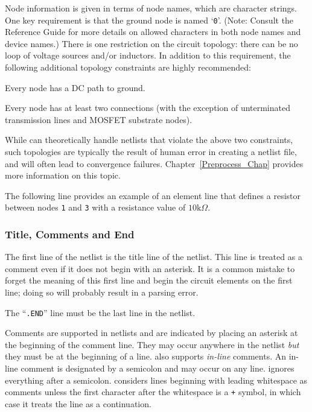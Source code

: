 Node information is given in terms of   node names, which are character strings.  One key
requirement is that the  ground node is named `\texttt{0}'.
(Note: Consult the \Xyce{} Reference Guide\ReferenceGuide{} for more details on 
allowed characters in both node names and device names.)
There is one restriction on the  
circuit topology: there can be no loop of voltage sources and/or inductors.
In addition to this requirement, the following additional topology 
constraints are highly recommended:
\begin{XyceItemize}
\item Every node has a DC path to ground.
\item Every node has at least two connections (with the exception of
  unterminated transmission lines and MOSFET substrate nodes).
\end{XyceItemize}
While \Xyce{} can theoretically handle netlists that violate the above two 
constraints, such topologies are typically the result of human error in 
creating a netlist file, and will often lead to convergence failures.  Chapter~\ref{Preprocess_Chap} provides more information on this topic.


The following line provides an example of an element line that defines a
resistor between nodes \texttt{1} and \texttt{3} with a resistance value 
of $10 \mbox{k}\Omega$.


\subsubsection{Title, Comments and End}

The first line of the netlist is the title line of the netlist.  This line is treated as a comment even if it
does not begin with an asterisk.  It is a common mistake to forget the
meaning of this first line and begin the circuit elements on the first
line; doing so will probably result in a parsing error.


The ``\verb+.END+'' line must be the last line in the
netlist.

Comments are supported in netlists and are indicated by
placing an asterisk at the beginning of the comment line.  They may occur
anywhere in the netlist \emph{but} they must be at the beginning of a line.
\Xyce{} also supports \emph{in-line\/} comments.  An in-line comment is designated by a semicolon and may occur on any line. \Xyce{} ignores everything after a semicolon. \Xyce{} considers lines beginning with leading whitespace as comments
unless the first character after the whitespace is a \verb|+| symbol, in which case it treats the line as a continuation. 

